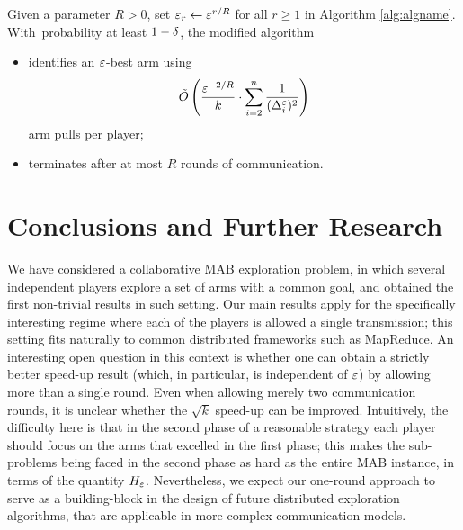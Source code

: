 \documentclass{article} %
\newcommand{\Dele}{\Del^{\eps}}
\begin{document}
\begin{corollary} \label{cor:main3}
Given a parameter $R > 0$, set $\varepsilon_r \gets \varepsilon^{r/R}$ for all $r \ge 1$ in Algorithm \ref{alg:algname}.
With~probability at least $1-\delta$, the modified algorithm%
\begin{itemize}
\item
identifies an $\varepsilon$-best arm using
\begin{align*}
	\tO\lr{
		\frac{\eps^{-2/R}}{k}
		\cdot
		\sum_{i=2}^{n} \frac{1}{(\Dele_i)^2}
	}
\end{align*}
arm pulls per player;
\item
terminates after at most $R$ rounds of communication.
\end{itemize}
\end{corollary}



%

\section{Conclusions and Further Research} \label{sec:conc}

We have considered a collaborative MAB exploration problem, in which several independent players explore a set of arms with a common goal, and obtained the first non-trivial results in such setting.
Our main results apply for the specifically interesting regime where each of the players is allowed a single transmission; this setting 
fits naturally to common distributed frameworks such as MapReduce. 
An interesting open question in this context is whether one can obtain a strictly better speed-up result (which, in particular, is independent of $\varepsilon$) by allowing more than a single round.
Even when allowing merely two communication rounds, it is unclear whether the $\sqrt{k}$ speed-up can be improved. 
Intuitively, the difficulty here is that in the second phase of a reasonable strategy each player should focus on the arms that excelled in the first phase; this makes the sub-problems being faced in the second phase as hard as the entire MAB instance, in terms of the quantity $H_\varepsilon$.
Nevertheless, we expect our one-round approach to serve as a building-block in the design of future distributed exploration algorithms, that are applicable in more complex communication models.
\end{document}
